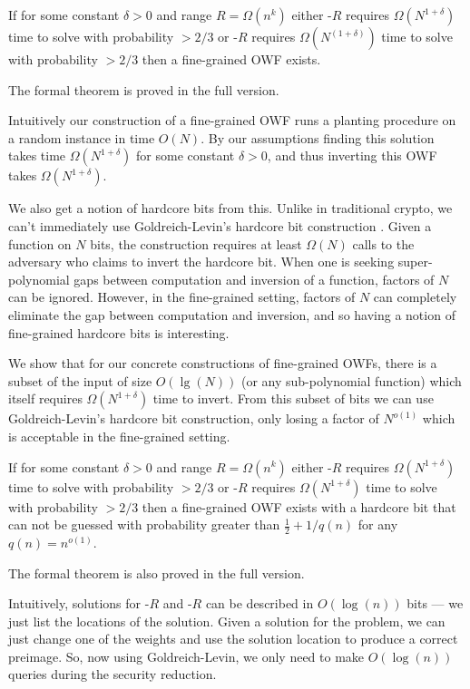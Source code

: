 \begin{theorem}
	If for some constant $\delta>0$ and range $R = \Omega(n^k)$ either \kSum-$R$ requires $\Omega(N^{1+\delta})$ time to solve with probability $>2/3$ or \zkclique-$R$ requires $\Omega(N^{(1+\delta)})$ time to solve with probability $>2/3$  then a fine-grained OWF exists.
\end{theorem}
The formal theorem is proved in the full version.

Intuitively our construction of a fine-grained OWF runs a planting procedure on a random instance in time $O(N)$. By our assumptions finding this solution takes time $\Omega(N^{1+\delta})$ for some constant $\delta > 0$, and thus inverting this OWF takes $\Omega(N^{1+\delta})$.

We also get a notion of hardcore bits from this. Unlike in traditional crypto, we can't immediately use Goldreich-Levin's hardcore bit construction \cite{hardCoreBitsAndXorLemmaFromGL}. Given a function on $N$ bits, the construction requires at least $\Omega(N)$ calls to the adversary who claims to invert the hardcore bit. When one is seeking super-polynomial gaps between computation and inversion of a function, factors of $N$ can be ignored. However, in the fine-grained setting, factors of $N$ can completely eliminate the gap between computation and inversion, and so having a notion of fine-grained hardcore bits is interesting.

We show that for our concrete constructions of fine-grained OWFs, there is a subset of the input of size $O(\lg(N))$ (or any sub-polynomial function) which itself requires $\Omega(N^{1+\delta})$ time to invert. From this subset of bits we can use Goldreich-Levin's hardcore bit construction, only losing a factor of $N^{o(1)}$ which is acceptable in the fine-grained setting.

\begin{theorem}
	If for some constant $\delta>0$ and range $R = \Omega(n^k)$ either \kSum-$R$ requires $\Omega(N^{1+\delta})$ time to solve with probability $>2/3$ or \zkclique-$R$ requires $\Omega(N^{1+\delta})$ time to solve with probability $>2/3$  then a fine-grained OWF exists with a hardcore bit that can not be guessed with probability greater than $\frac 1 2 +1/q(n)$ for any $q(n) = n^{o(1)}$.
\end{theorem}
The formal theorem is also proved in the full version.

Intuitively, solutions for \kSum-$R$ and \zkclique-$R$ can be described in $O(\log(n))$ bits --- we just list the locations of the solution. Given a solution for the problem, we can just change one of the weights and use the solution location to produce a correct preimage. So, now using Goldreich-Levin, we only need to make $O(\log(n))$ queries during the security reduction.

